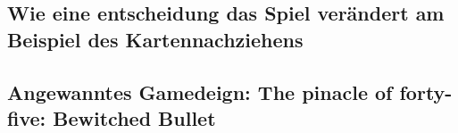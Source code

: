 %


\subsection{Wie eine entscheidung das Spiel verändert am Beispiel des Kartennachziehens}\label{subsec:placementMatters}




\subsection{Angewanntes Gamedeign: The pinacle of forty-five: Bewitched Bullet}\label{subsec:placementMatters}


\renewcommand{\kapitelautor}{}
